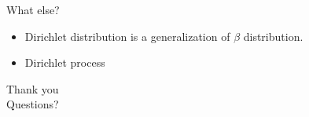 \documentclass[handout]{beamer}
\begin{document}

\begin{frame}{What else?}
    \begin{itemize}
        \item Dirichlet distribution is a generalization of $\beta$ distribution.
        \item Dirichlet process
    \end{itemize}
\end{frame}

\begin{frame}
\huge{Thank you}\\
\huge{Questions?}\\
\end{frame}
\end{document}
